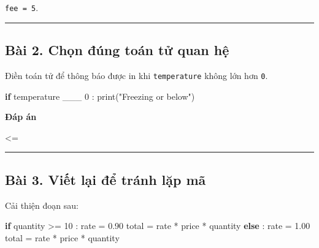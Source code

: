 \documentclass[
  11pt,
  a4paper,
]{article}
\newenvironment{Shaded}{}{}
\newcommand{\BuiltInTok}[1]{\textcolor[rgb]{0.00,0.50,0.00}{#1}}
\newcommand{\ControlFlowTok}[1]{\textcolor[rgb]{0.00,0.44,0.13}{\textbf{#1}}}
\newcommand{\DecValTok}[1]{\textcolor[rgb]{0.25,0.63,0.44}{#1}}
\newcommand{\FloatTok}[1]{\textcolor[rgb]{0.25,0.63,0.44}{#1}}
\newcommand{\NormalTok}[1]{#1}
\newcommand{\OperatorTok}[1]{\textcolor[rgb]{0.40,0.40,0.40}{#1}}
\newcommand{\StringTok}[1]{\textcolor[rgb]{0.25,0.44,0.63}{#1}}
\begin{document}
\texttt{fee\ =\ 5}.

\begin{center}\rule{0.5\linewidth}{0.5pt}\end{center}

\subsection{Bài 2. Chọn đúng toán tử quan
hệ}\label{buxe0i-2.-chux1ecdn-ux111uxfang-touxe1n-tux1eed-quan-hux1ec7}

Điền toán tử để thông báo được in khi \texttt{temperature} không lớn hơn
\texttt{0}.

\begin{Shaded}
\begin{Highlighting}[]
\ControlFlowTok{if}\NormalTok{ temperature \_\_\_ }\DecValTok{0}\NormalTok{ :}
    \BuiltInTok{print}\NormalTok{(}\StringTok{"Freezing or below"}\NormalTok{)}
\end{Highlighting}
\end{Shaded}

\textbf{Đáp án}

\begin{Shaded}
\begin{Highlighting}[]
\OperatorTok{\textless{}=}
\end{Highlighting}
\end{Shaded}

\begin{center}\rule{0.5\linewidth}{0.5pt}\end{center}

\subsection{Bài 3. Viết lại để tránh lặp
mã}\label{buxe0i-3.-viux1ebft-lux1ea1i-ux111ux1ec3-truxe1nh-lux1eb7p-muxe3}

Cải thiện đoạn sau:

\begin{Shaded}
\begin{Highlighting}[]
\ControlFlowTok{if}\NormalTok{ quantity }\OperatorTok{\textgreater{}=} \DecValTok{10}\NormalTok{ :}
\NormalTok{    rate }\OperatorTok{=} \FloatTok{0.90}
\NormalTok{    total }\OperatorTok{=}\NormalTok{ rate }\OperatorTok{*}\NormalTok{ price }\OperatorTok{*}\NormalTok{ quantity}
\ControlFlowTok{else}\NormalTok{ :}
\NormalTok{    rate }\OperatorTok{=} \FloatTok{1.00}
\NormalTok{    total }\OperatorTok{=}\NormalTok{ rate }\OperatorTok{*}\NormalTok{ price }\OperatorTok{*}\NormalTok{ quantity}
\end{Highlighting}
\end{Shaded}
\end{document}
